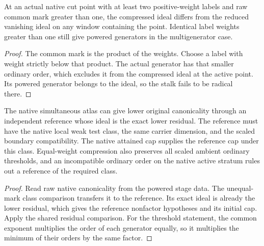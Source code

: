 \begin{theorem}
\label{hir:g8-native-unpowered-weight-obstruction}
\leanok
At an actual native cut point with at least two positive-weight
labels and raw common mark greater than one, the compressed ideal
differs from the reduced vanishing ideal on any window containing
the point. Identical label weights greater than one still give
powered generators in the multigenerator case.
\end{theorem}
\begin{proof}
The common mark is the product of the weights. Choose a label
with weight strictly below that product. The actual generator
has that smaller ordinary order, which excludes it from the
compressed ideal at the active point. Its powered generator
belongs to the ideal, so the stalk fails to be radical there.
\end{proof}

\begin{theorem}
\label{hir:g8-native-independent-residual-reference}
\leanok
The native simultaneous atlas can give lower original canonicality
through an independent reference whose ideal is the exact lower
residual. The reference must have the native local weak test class,
the same carrier dimension, and the scaled boundary compatibility.
The native attained cap supplies the reference cap under this class.
Equal-weight compression also preserves all scaled ambient ordinary
thresholds, and an incompatible ordinary order on the native active
stratum rules out a reference of the required class.
\end{theorem}
\begin{proof}
Read raw native canonicality from the powered stage data. The
unequal-mark class comparison transfers it to the reference.
Its exact ideal is already the lower residual, which gives the
reference nonfactor hypotheses and its initial cap. Apply the
shared residual comparison. For the threshold statement, the
common exponent multiplies the order of each generator equally,
so it multiplies the minimum of their orders by the same factor.
\end{proof}

